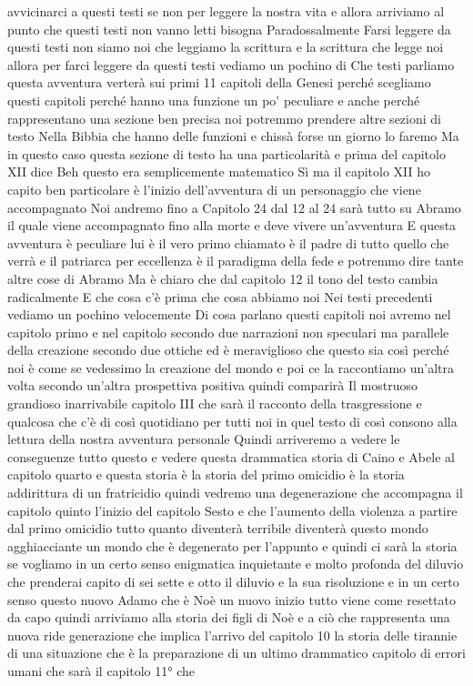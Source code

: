 avvicinarci a questi testi se non per leggere la nostra vita e allora arriviamo al punto che questi testi non vanno letti bisogna Paradossalmente Farsi leggere da questi testi non siamo noi che leggiamo la scrittura e la scrittura che legge noi
allora per farci leggere da questi testi vediamo un pochino di Che testi parliamo questa avventura verterà sui primi 11 capitoli della Genesi perché scegliamo questi capitoli perché hanno una funzione un po' peculiare e anche perché rappresentano una sezione ben precisa noi potremmo prendere altre sezioni di testo Nella Bibbia che hanno delle funzioni e chissà forse un giorno lo faremo Ma in questo caso questa sezione di testo ha una particolarità e prima del capitolo XII dice Beh questo era semplicemente matematico Sì ma il capitolo XII ho capito ben particolare è l'inizio dell'avventura di
un personaggio che viene accompagnato Noi andremo fino a Capitolo 24 dal 12 al 24 sarà tutto su Abramo il quale viene accompagnato fino alla morte e deve vivere un'avventura E questa avventura è peculiare lui è il vero primo chiamato è il padre di tutto quello che verrà e il patriarca per eccellenza è il paradigma della fede e potremmo dire tante altre cose di Abramo Ma è chiaro che dal capitolo 12 il tono del testo cambia radicalmente E che cosa c'è prima che cosa abbiamo noi Nei testi precedenti vediamo un pochino velocemente Di cosa parlano questi capitoli noi avremo nel capitolo primo e nel capitolo secondo due narrazioni non speculari ma parallele della creazione secondo due ottiche ed è meraviglioso che questo sia così perché noi è come se vedessimo la creazione del mondo e poi ce la raccontiamo un'altra volta secondo un'altra prospettiva
positiva quindi comparirà Il mostruoso grandioso inarrivabile capitolo III che sarà il racconto della trasgressione e qualcosa che c'è di così quotidiano per tutti noi in quel testo di così consono alla lettura della nostra avventura personale Quindi arriveremo a vedere le conseguenze tutto questo e vedere questa drammatica storia di Caino e Abele al capitolo quarto e questa storia è la storia del primo omicidio è la storia addirittura di un fratricidio quindi vedremo una degenerazione che accompagna il capitolo quinto l'inizio del capitolo Sesto e che l'aumento della violenza a partire dal primo omicidio tutto quanto diventerà terribile diventerà
questo mondo agghiacciante un mondo che è degenerato per l'appunto e quindi ci sarà la storia se vogliamo in un certo senso enigmatica inquietante e molto profonda del diluvio che prenderai capito di sei sette e otto il diluvio e la sua risoluzione e in un certo senso questo nuovo Adamo che è Noè un nuovo inizio tutto viene come resettato da capo quindi arriviamo alla storia dei figli di Noè e a ciò che rappresenta una nuova ride generazione che implica l'arrivo del capitolo 10 la storia delle tirannie di una situazione che è la preparazione di un ultimo drammatico capitolo di errori umani che sarà il capitolo 11° che
